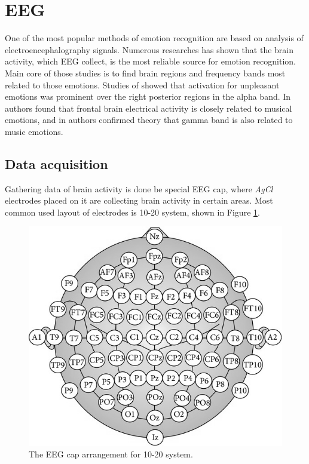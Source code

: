 \documentclass[10pt,journal,compsoc,twoside]{IEEEtran}
\newcommand{\Ref}[2]{#2 \ref{#1}}
\begin{document}
\section{EEG}
One of the most popular methods of emotion recognition are based on analysis of electroencephalography signals. Numerous researches\cite{LinMusic,GaoMehmood,NieWangShiLu,AdolphsTranesDamasio2003,DamasioGrabowski2000} has shown that the brain activity, which EEG collect, is the most reliable source for emotion recognition. Main core of those studies is to find brain regions and frequency bands most related to those emotions. Studies of \cite{SarloBuodoPoliPalomba} showed that activation for unpleasant emotions was prominent over the right posterior regions in the alpha band. In \cite{SchmidtTrainor2001} authors found that frontal brain electrical activity is closely related to musical emotions, and in \cite{LiLu2009} authors confirmed theory that gamma band is also related to music emotions.

\subsection{Data acquisition} 
Gathering data of brain activity is done be special EEG cap, where \textit{AgCl} electrodes placed on it are collecting brain activity in certain areas. Most common used layout of electrodes is 10-20 system, shown in \Ref{fig:1020electrodes}{Figure}.

\begin{figure}[ht]
	\centering
	\includegraphics[width=0.7\linewidth]{10_20_electrodes}
	\caption{The EEG cap arrangement for 10-20 system.\cite{JirayucharoensakSuwichaPanngumIsrasenaPasin2014}}
	\label{fig:1020electrodes}
\end{figure}
\end{document}
